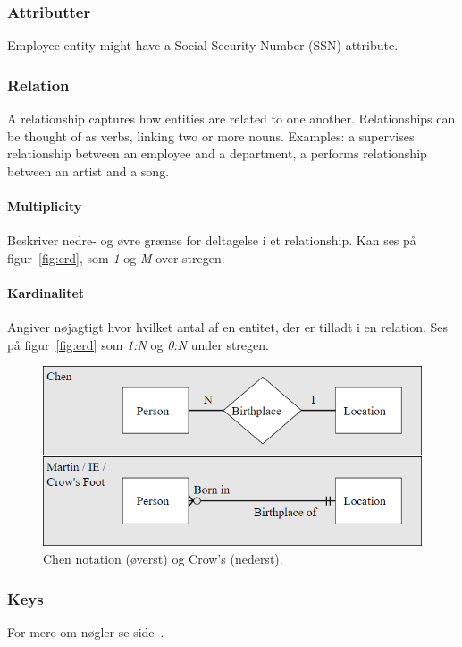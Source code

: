 \subsubsection{Attributter}
Employee entity might have a Social Security Number (SSN) attribute.

\subsubsection{Relation}
A relationship captures how entities are related to one another. Relationships can be thought of as verbs, linking two or more nouns. Examples: a supervises relationship between an employee and a department, a performs relationship between an artist and a song.

\paragraph{Multiplicity}
Beskriver nedre- og øvre grænse for deltagelse i et relationship. Kan ses på figur~\ref{fig:erd}, som \textit{1} og \textit{M} over stregen.

\paragraph{Kardinalitet}
Angiver nøjagtigt hvor hvilket antal af en entitet, der er tilladt i en relation. Ses på figur~\ref{fig:erd} som \textit{1:N} og \textit{0:N} under stregen.

\begin{figure}[h]
	\centering
	\includegraphics[width=0.8\linewidth]{figs/spm1/notation}
	\caption{Chen notation (øverst) og Crow's (nederst).}
	\label{fig:notation}
\end{figure}

\subsubsection{Keys}
For mere om nøgler se side~\pageref{sec:keys}.

